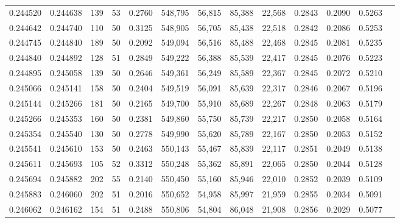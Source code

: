 \begin{tabular}{rrrrrrrrrrrrr}
0.244520 & 0.244638 &   139 &  53 &                                     0.2760 & 548,795 &  56,815 &  85,388 &  22,568 & 0.2843 & 0.2090 & 0.5263 \\
0.244642 & 0.244740 &   110 &  50 &                                     0.3125 & 548,905 &  56,705 &  85,438 &  22,518 & 0.2842 & 0.2086 & 0.5253 \\
0.244745 & 0.244840 &   189 &  50 &                                     0.2092 & 549,094 &  56,516 &  85,488 &  22,468 & 0.2845 & 0.2081 & 0.5235 \\
0.244840 & 0.244892 &   128 &  51 &                                     0.2849 & 549,222 &  56,388 &  85,539 &  22,417 & 0.2845 & 0.2076 & 0.5223 \\
0.244895 & 0.245058 &   139 &  50 &                                     0.2646 & 549,361 &  56,249 &  85,589 &  22,367 & 0.2845 & 0.2072 & 0.5210 \\
0.245066 & 0.245141 &   158 &  50 &                                     0.2404 & 549,519 &  56,091 &  85,639 &  22,317 & 0.2846 & 0.2067 & 0.5196 \\
0.245144 & 0.245266 &   181 &  50 &                                     0.2165 & 549,700 &  55,910 &  85,689 &  22,267 & 0.2848 & 0.2063 & 0.5179 \\
0.245266 & 0.245353 &   160 &  50 &                                     0.2381 & 549,860 &  55,750 &  85,739 &  22,217 & 0.2850 & 0.2058 & 0.5164 \\
0.245354 & 0.245540 &   130 &  50 &                                     0.2778 & 549,990 &  55,620 &  85,789 &  22,167 & 0.2850 & 0.2053 & 0.5152 \\
0.245541 & 0.245610 &   153 &  50 &                                     0.2463 & 550,143 &  55,467 &  85,839 &  22,117 & 0.2851 & 0.2049 & 0.5138 \\
0.245611 & 0.245693 &   105 &  52 &                                     0.3312 & 550,248 &  55,362 &  85,891 &  22,065 & 0.2850 & 0.2044 & 0.5128 \\
0.245694 & 0.245882 &   202 &  55 &                                     0.2140 & 550,450 &  55,160 &  85,946 &  22,010 & 0.2852 & 0.2039 & 0.5109 \\
0.245883 & 0.246060 &   202 &  51 &                                     0.2016 & 550,652 &  54,958 &  85,997 &  21,959 & 0.2855 & 0.2034 & 0.5091 \\
0.246062 & 0.246162 &   154 &  51 &                                     0.2488 & 550,806 &  54,804 &  86,048 &  21,908 & 0.2856 & 0.2029 & 0.5077 \\

\end{tabular}
